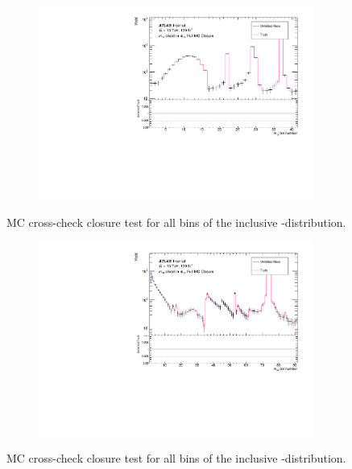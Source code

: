 \begin{figure}[htb]
  \centering
  \begin{subfigure}{.65\textwidth}\centering\includegraphics[width = 0.99\textwidth]{Figures/m4l/UnfoldingStudies/v014_closure/FullMCClosure_m12_m4l.pdf}\end{subfigure}
\caption{MC cross-check closure test for all bins of the inclusive \mZOne-\mFourL distribution.}
 \end{figure}

\begin{figure}[htb]
  \centering
  \begin{subfigure}{.65\textwidth}\centering\includegraphics[width = 0.99\textwidth]{Figures/m4l/UnfoldingStudies/v014_closure/FullMCClosure_m34_m4l.pdf}\end{subfigure}
\caption{MC cross-check closure test for all bins of the inclusive \mZTwo-\mFourL distribution.}
 \end{figure}


